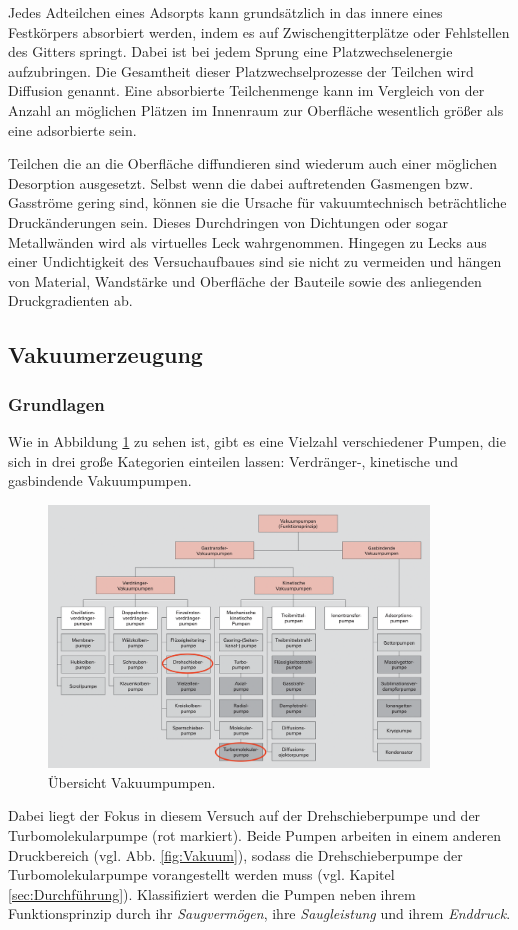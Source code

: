 Jedes Adteilchen eines Adsorpts kann grundsätzlich in das innere eines Festkörpers absorbiert werden, indem es auf Zwischengitterplätze oder Fehlstellen des Gitters springt.
Dabei ist bei jedem Sprung eine Platzwechselenergie aufzubringen.
Die Gesamtheit dieser Platzwechselprozesse der Teilchen wird Diffusion genannt.
Eine absorbierte Teilchenmenge kann im Vergleich von der Anzahl an möglichen Plätzen im Innenraum zur Oberfläche wesentlich größer als eine adsorbierte sein.

Teilchen die an die Oberfläche diffundieren sind wiederum auch einer möglichen Desorption ausgesetzt.
Selbst wenn die dabei auftretenden Gasmengen bzw. Gasströme gering sind, können sie die Ursache für vakuumtechnisch beträchtliche Druckänderungen sein.
Dieses Durchdringen von Dichtungen oder sogar Metallwänden wird als virtuelles Leck wahrgenommen.
Hingegen zu Lecks aus einer Undichtigkeit des Versuchaufbaues sind sie nicht zu vermeiden und hängen von Material, Wandstärke und Oberfläche der Bauteile sowie des anliegenden Druckgradienten ab.

\subsection{Vakuumerzeugung}
\subsubsection{Grundlagen}
Wie in Abbildung \ref{fig:pumpen} zu sehen ist, gibt es eine Vielzahl verschiedener Pumpen,
die sich in drei große Kategorien einteilen lassen:
Verdränger-, kinetische und gasbindende Vakuumpumpen.
\begin{figure}[h]
    \centering
    \includegraphics[width=0.9\textwidth]{abb/pumpen.png}
    \caption{Übersicht Vakuumpumpen\cite{Pfeifer}.} 
    \label{fig:pumpen}
\end{figure} 
Dabei liegt der Fokus in diesem Versuch auf der Drehschieberpumpe und der Turbomolekularpumpe (rot markiert).
Beide Pumpen arbeiten in einem anderen Druckbereich (vgl. Abb. \ref{fig:Vakuum}), 
sodass die Drehschieberpumpe der Turbomolekularpumpe vorangestellt werden muss (vgl. Kapitel \ref{sec:Durchführung}).
Klassifiziert werden die Pumpen neben ihrem Funktionsprinzip durch ihr \textit{Saugvermögen}, ihre
\textit{Saugleistung} und ihrem \textit{Enddruck}.

